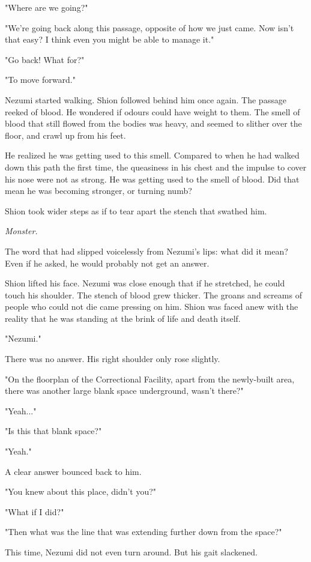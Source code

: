 "Where are we going?"

"We're going back along this passage, opposite of how we just came. Now
isn't that easy? I think even you might be able to manage it."

"Go back! What for?"

"To move forward."

Nezumi started walking. Shion followed behind him once again. The
passage reeked of blood. He wondered if odours could have weight to
them. The smell of blood that still flowed from the bodies was heavy,
and seemed to slither over the floor, and crawl up from his feet.

He realized he was getting used to this smell. Compared to when he had
walked down this path the first time, the queasiness in his chest and
the impulse to cover his nose were not as strong. He was getting used to
the smell of blood. Did that mean he was becoming stronger, or turning
numb?

Shion took wider steps as if to tear apart the stench that swathed him.

\emph{Monster.}

The word that had slipped voicelessly from Nezumi's lips: what did it
mean? Even if he asked, he would probably not get an answer.

Shion lifted his face. Nezumi was close enough that if he stretched, he
could touch his shoulder. The stench of blood grew thicker. The groans
and screams of people who could not die came pressing on him. Shion was
faced anew with the reality that he was standing at the brink of life
and death itself.

"Nezumi."

There was no answer. His right shoulder only rose slightly.

"On the floorplan of the Correctional Facility, apart from the
newly-built area, there was another large blank space underground,
wasn't there?"

"Yeah..."

"Is this that blank space?"

"Yeah."

A clear answer bounced back to him.

"You knew about this place, didn't you?"

"What if I did?"

"Then what was the line that was extending further down from the space?"

This time, Nezumi did not even turn around. But his gait slackened.

